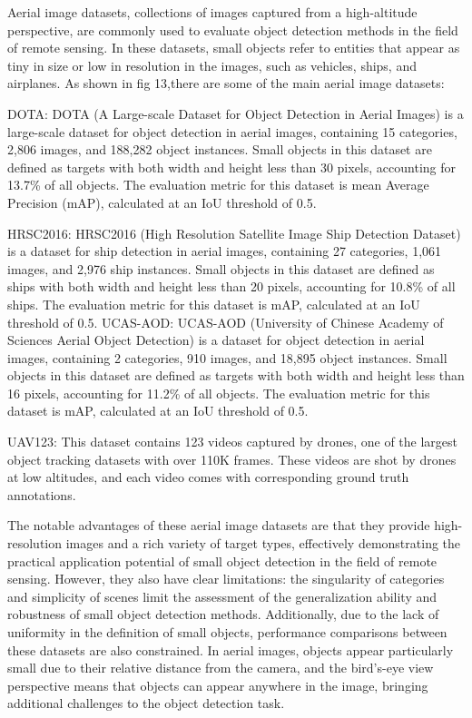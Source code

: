 \documentclass[journal]{IEEEtran}
\begin{document}
Aerial image datasets, collections of images captured from a high-altitude perspective, are commonly used to evaluate object detection methods in the field of remote sensing. In these datasets, small objects refer to entities that appear as tiny in size or low in resolution in the images, such as vehicles, ships, and airplanes. As shown in fig 13,there are some of the main aerial image datasets:

DOTA\cite{xia2018dota}: DOTA (A Large-scale Dataset for Object Detection in Aerial Images) is a large-scale dataset for object detection in aerial images, containing 15 categories, 2,806 images, and 188,282 object instances. Small objects in this dataset are defined as targets with both width and height less than 30 pixels, accounting for 13.7\% of all objects. The evaluation metric for this dataset is mean Average Precision (mAP), calculated at an IoU threshold of 0.5.

HRSC2016\cite{liu2017high}: HRSC2016 (High Resolution Satellite Image Ship Detection Dataset) is a dataset for ship detection in aerial images, containing 27 categories, 1,061 images, and 2,976 ship instances. Small objects in this dataset are defined as ships with both width and height less than 20 pixels, accounting for 10.8\% of all ships. The evaluation metric for this dataset is mAP, calculated at an IoU threshold of 0.5.
UCAS-AOD\cite{zhu2015orientation}: UCAS-AOD (University of Chinese Academy of Sciences Aerial Object Detection) is a dataset for object detection in aerial images, containing 2 categories, 910 images, and 18,895 object instances. Small objects in this dataset are defined as targets with both width and height less than 16 pixels, accounting for 11.2\% of all objects. The evaluation metric for this dataset is mAP, calculated at an IoU threshold of 0.5.

UAV123\cite{mueller2016benchmark}: This dataset contains 123 videos captured by drones, one of the largest object tracking datasets with over 110K frames. These videos are shot by drones at low altitudes, and each video comes with corresponding ground truth annotations.

The notable advantages of these aerial image datasets are that they provide high-resolution images and a rich variety of target types, effectively demonstrating the practical application potential of small object detection in the field of remote sensing. However, they also have clear limitations: the singularity of categories and simplicity of scenes limit the assessment of the generalization ability and robustness of small object detection methods. Additionally, due to the lack of uniformity in the definition of small objects, performance comparisons between these datasets are also constrained. In aerial images, objects appear particularly small due to their relative distance from the camera, and the bird’s-eye view perspective means that objects can appear anywhere in the image, bringing additional challenges to the object detection task.
\end{document}
